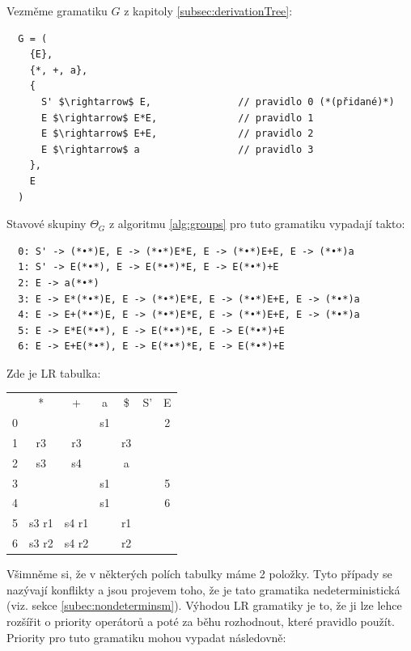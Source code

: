 \begin{exmp} Vezměme gramatiku $G$ z kapitoly \ref{subsec:derivationTree}:


\begin{lstlisting}
  G = (
    {E},
    {*, +, a},
    {
      S' $\rightarrow$ E,               // pravidlo 0 (*(přidané)*)
      E $\rightarrow$ E*E,              // pravidlo 1
      E $\rightarrow$ E+E,              // pravidlo 2
      E $\rightarrow$ a                 // pravidlo 3
    },
    E
  )
\end{lstlisting}

\noindent
Stavové skupiny $\Theta_G$ z algoritmu \ref{alg:groups} pro tuto gramatiku vypadají takto:
\begin{lstlisting}
  0: S' -> (*•*)E, E -> (*•*)E*E, E -> (*•*)E+E, E -> (*•*)a
  1: S' -> E(*•*), E -> E(*•*)*E, E -> E(*•*)+E
  2: E -> a(*•*)
  3: E -> E*(*•*)E, E -> (*•*)E*E, E -> (*•*)E+E, E -> (*•*)a
  4: E -> E+(*•*)E, E -> (*•*)E*E, E -> (*•*)E+E, E -> (*•*)a
  5: E -> E*E(*•*), E -> E(*•*)*E, E -> E(*•*)+E
  6: E -> E+E(*•*), E -> E(*•*)*E, E -> E(*•*)+E
\end{lstlisting}

\noindent
Zde je LR tabulka:

\begin{table}[H]
  \centering
  \begin{tabular}{| c || c | c | c | c || c | c |}
    \hline
      & * & + & a & \$& S'& E \\
    \hhline{|=||=|=|=|=||=|=|}
    0 &   &   & s1 &   &   & 2 \\
    \hline
    1 & r3 & r3 &   & r3 &   &   \\
    \hline
    2 & s3 & s4 &   & a &   &   \\
    \hline
    3 &   &   & s1 &   &   & 5 \\
    \hline
    4 &   &   & s1 &   &   & 6 \\
    \hline
    5 & s3 r1 &  s4 r1 & & r1 &   & \\
    \hline
    6 & s3 r2 &  s4 r2 & & r2 &   & \\
    \hline
  \end{tabular}
\end{table}

Všimněme si, že v některých polích tabulky máme 2 položky. Tyto případy
se nazývají  konflikty a jsou projevem toho, že je tato
gramatika nedeterministická (viz. sekce \ref{subec:nondeterminsm}).
Výhodou LR gramatiky je to, že ji lze lehce rozšířit o priority operátorů
a poté za běhu rozhodnout, které pravidlo použít.
Priority pro tuto gramatiku mohou vypadat následovně:


\end{exmp}
